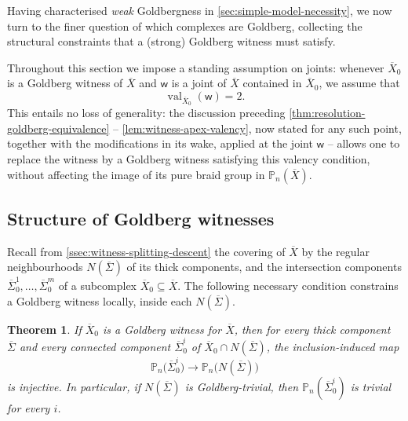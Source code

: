 \documentclass[reqno]{amsart}
\newtheorem{theorem}{Theorem}[section]
\theoremstyle{definition}
\newcommand\sfw{\mathsf{w}}
\newcommand{\PB}{\mathbb{P}}
\renewcommand{\bar}{\overline}
\DeclareMathOperator{\val}{val}
\numberwithin{equation}{section}
\begin{document}
Having characterised \emph{weak} Goldbergness in
\cref{sec:simple-model-necessity}, we now turn to the finer
question of which complexes are Goldberg, collecting the
structural constraints that a (strong) Goldberg witness must
satisfy.

Throughout this section we impose a standing assumption on
joints: whenever \(\bar X_0\) is a Goldberg witness of \(\bar X\)
and \(\sfw\) is a joint of \(\bar X\) contained in \(\bar X_0\), we
assume that
\[
\val_{\bar X_0}(\sfw)=2 .
\]
This entails no loss of generality: the discussion preceding
\cref{thm:resolution-goldberg-equivalence} --
\cref{lem:witness-apex-valency}, now stated for any such point,
together with the modifications in its wake, applied at the joint
\(\sfw\) -- allows one to replace the witness by a Goldberg witness
satisfying this valency condition, without affecting the image of
its pure braid group in \(\PB_n(\bar X)\).

\subsection{Structure of Goldberg witnesses}
\label{ssec:goldberg-witness-structure}

Recall from \cref{ssec:witness-splitting-descent} the covering of
\(\bar X\) by the regular neighbourhoods \(N(\bar\Sigma)\) of its
thick components, and the intersection components
\(\bar\Sigma_0^1,\dots,\bar\Sigma_0^m\) of a subcomplex
\(\bar X_0\subseteq\bar X\). The following necessary condition
constrains a Goldberg witness locally, inside each
\(N(\bar\Sigma)\).

\begin{theorem}\label{thm:witness-local-injectivity}
If \(\bar X_0\) is a Goldberg witness for \(\bar X\), then for every
thick component \(\bar\Sigma\) and every connected component
\(\bar\Sigma_0^i\) of \(\bar X_0\cap N(\bar\Sigma)\), the
inclusion-induced map
\[
\PB_n\bigl(\bar\Sigma_0^i\bigr)\longrightarrow\PB_n\bigl(N(\bar\Sigma)\bigr)
\]
is injective. In particular, if \(N(\bar\Sigma)\) is Goldberg-trivial,
then \(\PB_n(\bar\Sigma_0^i)\) is trivial for every \(i\).
\end{theorem}
\end{document}
